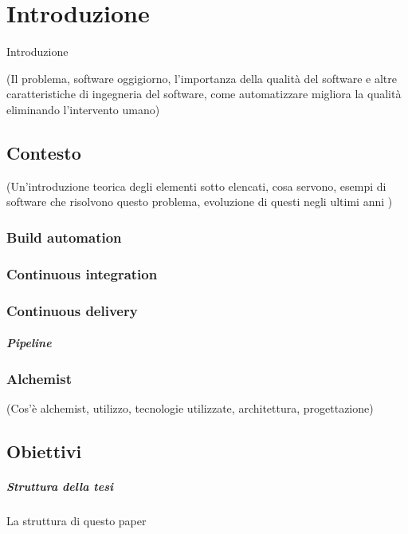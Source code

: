 \chapter{Introduzione}
\label{chap:introduction}

Introduzione 

(Il problema, software oggigiorno, l'importanza della qualità del software e altre caratteristiche di ingegneria del software, come automatizzare migliora la qualità eliminando l'intervento umano)

\section{Contesto}

(Un'introduzione teorica degli elementi sotto elencati, cosa servono, esempi di software che risolvono questo problema, evoluzione di questi negli ultimi anni )

\subsection{Build automation}
\subsection{Continuous integration}
\subsection{Continuous delivery}
\paragraph{Pipeline}

\subsection{Alchemist}\label{sec:alchemist}

(Cos'è alchemist, utilizzo, tecnologie utilizzate, architettura, progettazione)

\section{Obiettivi}

\paragraph{Struttura della tesi}

La struttura di questo paper
